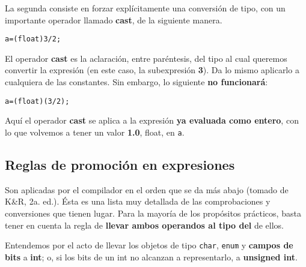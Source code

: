 La segunda consiste en forzar explícitamente una conversión de tipo, con un importante operador
llamado \textbf{cast}, de la siguiente manera.
\begin{lstlisting}
a=(float)3/2;
\end{lstlisting}

El operador \textbf{cast} es la aclaración, entre paréntesis, del tipo al cual queremos convertir la expresión (en este caso, la subexpresión \textbf{3}). Da lo mismo aplicarlo a cualquiera de las constantes. Sin embargo, lo siguiente \textbf{no funcionará}:
\begin{lstlisting}
a=(float)(3/2);
\end{lstlisting}

Aquí el operador \textbf{cast} se aplica a la expresión \textbf{ya evaluada como entero}, con lo que volvemos a tener
un valor \textbf{1.0}, float, en \lstinline{a}.

\subsection{Reglas de promoción en expresiones}

Son aplicadas por el compilador en el orden que se da más abajo (tomado de K\&R, 2a. ed.). Ésta es
una lista muy detallada de las comprobaciones y conversiones que tienen lugar. Para la mayoría de los
propósitos prácticos, basta tener en cuenta la regla de \textbf{llevar ambos operandos al tipo del } de
ellos.

Entendemos por  el acto de llevar los objetos de tipo \lstinline{char}, \lstinline{enum} y \textbf{campos de bits} a \textbf{int}; o, si los bits de un int no alcanzan a representarlo, a \textbf{unsigned int}.


